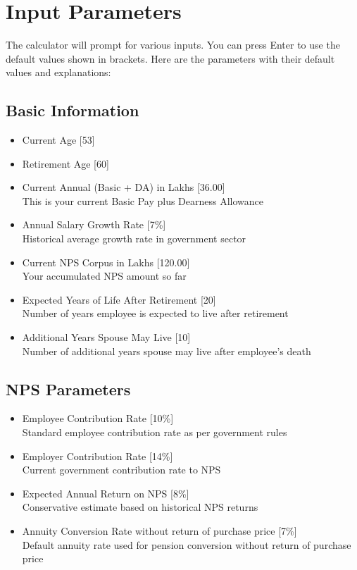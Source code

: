 \documentclass{article}
\begin{document}
\section{Input Parameters}
The calculator will prompt for various inputs. You can press Enter to use the default values shown in brackets. Here are the parameters with their default values and explanations:

\subsection{Basic Information}
\begin{itemize}
    \item Current Age [53]
    \item Retirement Age [60]
    \item Current Annual (Basic + DA) in Lakhs [36.00] \\
          This is your current Basic Pay plus Dearness Allowance
    \item Annual Salary Growth Rate [7\%] \\
          Historical average growth rate in government sector
    \item Current NPS Corpus in Lakhs [120.00] \\
          Your accumulated NPS amount so far
    \item Expected Years of Life After Retirement [20] \\
          Number of years employee is expected to live after retirement
    \item Additional Years Spouse May Live [10] \\
          Number of additional years spouse may live after employee's death
\end{itemize}

\subsection{NPS Parameters}
\begin{itemize}
    \item Employee Contribution Rate [10\%] \\
          Standard employee contribution rate as per government rules
    \item Employer Contribution Rate [14\%] \\
          Current government contribution rate to NPS
    \item Expected Annual Return on NPS [8\%] \\
          Conservative estimate based on historical NPS returns
    \item Annuity Conversion Rate without return of purchase price [7\%] \\
          Default annuity rate used for pension conversion without return of purchase price
\end{itemize}
\end{document}
